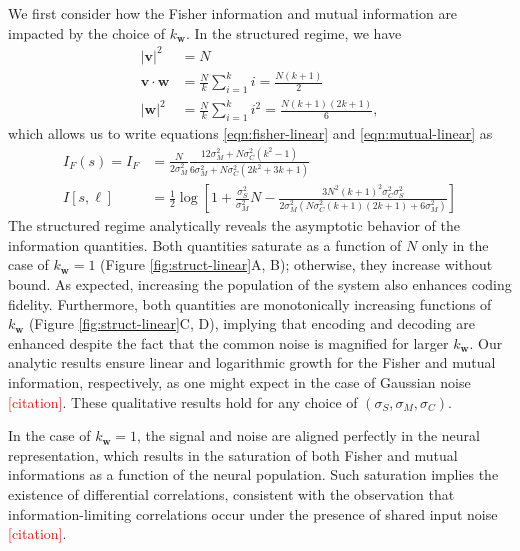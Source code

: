 \documentclass[11pt]{article}
\begin{document}
	We first consider how the Fisher information and mutual information are impacted by the choice of $k_{\mathbf{w}}$. In the structured regime, we have 
	\begin{align}
		|\mathbf{v}|^2 &= N \\
		\mathbf{v}\cdot\mathbf{w} &= \frac{N}{k} \sum_{i=1}^k i = \frac{N(k+1)}{2} \\
		|\mathbf{w}|^2 &= \frac{N}{k}\sum_{i=1}^k i^2 = \frac{N(k+1)(2k+1)}{6},
	\end{align}
	which allows us to write equations \ref{eqn:fisher-linear} and \ref{eqn:mutual-linear} as 
	\begin{align}
		I_F(s) = I_F &= \frac{N}{2\sigma_M^2} \frac{12 \sigma_M^2 + N \sigma_C^2 (k^2-1)}{6\sigma_M^2 + N\sigma_C^2 (2k^2+3k+1)} \\
		I[s, \boldsymbol{\ell}] &= \frac{1}{2} \log\left[1 + \frac{\sigma_S^2}{\sigma_M^2} N - \frac{3N^2(k+1)^2\sigma_C^2 \sigma_S^2}{2\sigma_M^2 \left(N\sigma_C^2(k+1)(2k+1) + 6 \sigma_M^2\right)}\right]
	\end{align}
	The structured regime analytically reveals the asymptotic behavior of the information quantities. Both quantities saturate as a function of $N$  only in the case of $k_{\mathbf{w}}=1$ (Figure \ref{fig:struct-linear}A, B); otherwise, they increase without bound. As expected, increasing the population of the system also enhances coding fidelity. Furthermore, both quantities are monotonically increasing functions of $k_{\mathbf{w}}$ (Figure \ref{fig:struct-linear}C, D), implying that encoding and decoding are enhanced despite the fact that the common noise is magnified for larger $k_{\mathbf{w}}$. Our analytic results ensure linear and logarithmic growth for the Fisher and mutual information, respectively, as one might expect in the case of Gaussian noise \textcolor{red}{[citation]}. These qualitative results hold for any choice of $(\sigma_S, \sigma_M, \sigma_C)$.
	
	In the case of $k_{\mathbf{w}}=1$, the signal and noise are aligned perfectly in the neural representation, which results in the saturation of both Fisher and mutual informations as a function of the neural population. Such saturation implies the existence of differential correlations, consistent with the observation that information-limiting correlations occur under the presence of shared input noise \textcolor{red}{[citation]}. 
	
\end{document}
